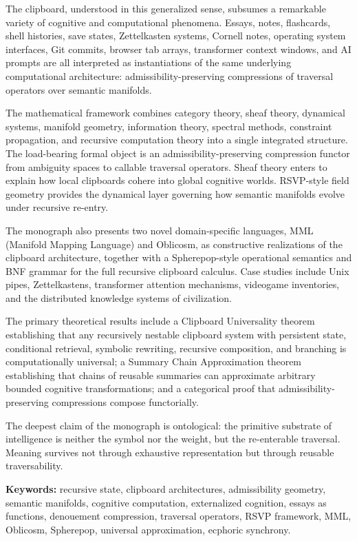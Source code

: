 \documentclass[12pt,oneside]{book}
\theoremstyle{plain}
\theoremstyle{definition}
\theoremstyle{plain}
\begin{document}
The clipboard, understood in this generalized sense, subsumes a remarkable variety of cognitive and computational phenomena. Essays, notes, flashcards, shell histories, save states, Zettelkasten systems, Cornell notes, operating system interfaces, Git commits, browser tab arrays, transformer context windows, and AI prompts are all interpreted as instantiations of the same underlying computational architecture: admissibility-preserving compressions of traversal operators over semantic manifolds.

The mathematical framework combines category theory, sheaf theory, dynamical systems, manifold geometry, information theory, spectral methods, constraint propagation, and recursive computation theory into a single integrated structure. The load-bearing formal object is an admissibility-preserving compression functor from ambiguity spaces to callable traversal operators. Sheaf theory enters to explain how local clipboards cohere into global cognitive worlds. RSVP-style field geometry provides the dynamical layer governing how semantic manifolds evolve under recursive re-entry.

The monograph also presents two novel domain-specific languages, MML (Manifold Mapping Language) and Oblicosm, as constructive realizations of the clipboard architecture, together with a Spherepop-style operational semantics and BNF grammar for the full recursive clipboard calculus. Case studies include Unix pipes, Zettelkastens, transformer attention mechanisms, videogame inventories, and the distributed knowledge systems of civilization.

The primary theoretical results include a Clipboard Universality theorem establishing that any recursively nestable clipboard system with persistent state, conditional retrieval, symbolic rewriting, recursive composition, and branching is computationally universal; a Summary Chain Approximation theorem establishing that chains of reusable summaries can approximate arbitrary bounded cognitive transformations; and a categorical proof that admissibility-preserving compressions compose functorially.

The deepest claim of the monograph is ontological: the primitive substrate of intelligence is neither the symbol nor the weight, but the re-enterable traversal. Meaning survives not through exhaustive representation but through reusable traversability.

\vspace{1em}
\noindent\textbf{Keywords:} recursive state, clipboard architectures, admissibility geometry, semantic manifolds, cognitive computation, externalized cognition, essays as functions, denouement compression, traversal operators, RSVP framework, MML, Oblicosm, Spherepop, universal approximation, ecphoric synchrony.
\end{document}
